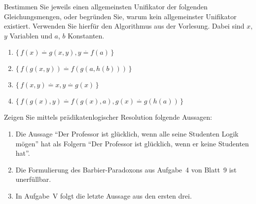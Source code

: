 \documentclass[german]{latteachCD}[2017/03/28]
\begin{document}
\newpage

\setcounter{exercise}{0}


\def\deq{\stackrel{\cdot}{=}}

\begin{exercise}
  Bestimmen Sie jeweils einen allgemeinsten Unifikator der folgenden
  Gleichungsmengen, oder begründen Sie, warum kein allgemeinster Unifikator
  existiert.  Verwenden Sie hierfür den Algorithmus aus der Vorlesung.  Dabei
  sind $x$, $y$ Variablen und $a$, $b$ Konstanten.
  \begin{enumerate}
  \item $\{\,f(x) \deq g(x,y), y \deq f(a)\,\}$
  \item $\{\,f(g(x,y)) \deq f(g(a,h(b)))\,\}$
  \item $\{\,f(x,y) \deq x, y \deq g(x)\,\}$
  \item $\{\,f(g(x),y) \deq f(g(x),a), g(x) \deq g(h(a))\,\}$
  \end{enumerate}
\end{exercise}


\begin{exercise}
  Zeigen Sie mittels prädikatenlogischer Resolution folgende Aussagen:
  \begin{enumerate}
  \item Die Aussage \enquote{Der Professor ist glücklich, wenn alle seine
      Studenten Logik mögen} hat als Folgern \enquote{Der Professor ist
      glücklich, wenn er keine Studenten hat}.
  \item Die Formulierung des Barbier-Paradoxons aus Aufgabe~4 von Blatt~9 ist
    unerfüllbar.
  \item In Aufgabe~V folgt die letzte Aussage aus den ersten drei. %
  \end{enumerate}
\end{exercise}
\end{document}
